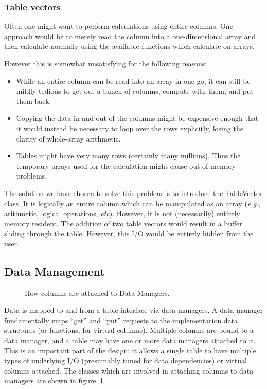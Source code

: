 \subsubsection{Table vectors}
\label{sec:TableVectors}

Often one might want to perform calculations using entire columns. One
approach would be to merely read the column into a one-dimensional
array and then calculate normally using the available functions which
calculate on arrays.

However this is somewhat unsatisfying for the following reasons:
\begin{itemize}
\item While an entire column can be read into an array in one go, it
      can still be mildly tedious to get out a bunch of columns, compute with
      them, and put them back.
\item Copying the data in and out of the columns might be expensive
      enough that it would instead be necessary to loop over the rows
      explicitly, losing the clarity of whole-array arithmetic.
\item Tables might have very many rows (certainly many millions). Thus
      the temporary arrays used for the calculation might cause
      out-of-memory problems.
\end{itemize}

The solution we have chosen to solve this problem is to introduce the
TableVector class. It is logically an entire column which can be
manipulated as an array ({\em e.g.}, arithmetic, logical operations,
{\em etc}).  However, it is not (necessarily) entirely memory
resident. The addition of two table vectors would result in a buffer
sliding through the table.  However, this I/O would be entirely hidden
from the user.

\subsection{Data Management}
\label{sec:DataManagement}

\begin{figure}
\epsfverbosetrue
\epsfysize=7.0in
\caption{How columns are attached to Data Managers.}
\label{fig:DbColumn}
\end{figure}

Data is mapped to and from a table interface via data managers. A data
manager fundamentally maps ``get'' and ``put'' requests to the
implementation data structures (or functions, for virtual columns).
Multiple columns are bound to a data manager, and a table may have one
or more data managers attached to it. This is an important part of the
design: it allows a single table to have multiple types of underlying
I/O (presumably tuned for data dependencies) or virtual columns
attached. The classes which are involved in attaching columns to data
managers are shown in figure~\ref{fig:DbColumn}.

